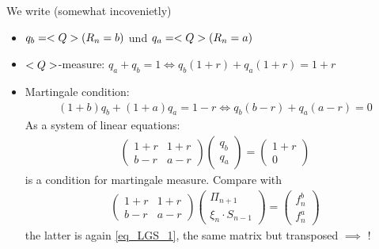 \begin{*remark}
	We write (somewhat incovenietly)
	\begin{itemize}
		\item $q_b = <Q>(R_n = b)$ und $q_a = <Q>(R_n = a)$
		\item $<Q>$-measure: $q_a + q_b = 1 \Leftrightarrow q_b(1+r) + q_a (1+r) = 1+r$
		\item Martingale condition:
		\begin{align*}
			 (1+b)q_b + (1+a)q_a = 1-r \Leftrightarrow q_b(b-r) + q_a(a-r) = 0
		\end{align*}
		As a system of linear equations:
		\begin{align*}
			\begin{pmatrix}
				1+r & 1+r \\
				b-r & a-r
			\end{pmatrix}
			\begin{pmatrix}
			q_b\\ q_a
			\end{pmatrix} =
			\begin{pmatrix}
				1+r\\ 0
			\end{pmatrix} \tag{SLE-2}\label{eq_2_4_LGS2}
		\end{align*}
		is a condition for martingale measure. Compare with 
		\begin{align*}
		\begin{pmatrix}
		1+r & 1+r \\
		b-r & a-r
		\end{pmatrix}
		\begin{pmatrix}
		\Pi_{n+1}\\ \xi_n \cdot S_{n-1}
		\end{pmatrix} =
		\begin{pmatrix}
		f_n^b\\ f_n^a
		\end{pmatrix}
		\end{align*}
		the latter is again \eqref{eq_LGS_1}, the same matrix but transposed $\implies$ !
	\end{itemize}  
\end{*remark}
